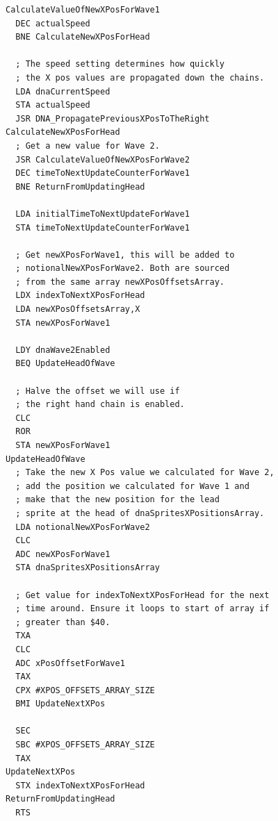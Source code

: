 \begin{minipage}[b]{0.55\linewidth}
\centering
  \begin{lstlisting}[basicstyle=\tiny, caption=Calculate the new X Pos value for the head sprites\, as well as propagate the
  values in \icode{dnaXPosDataHeadArray} to the right when required.]
CalculateValueOfNewXPosForWave1
  DEC actualSpeed
  BNE CalculateNewXPosForHead

  ; The speed setting determines how quickly 
  ; the X pos values are propagated down the chains.
  LDA dnaCurrentSpeed
  STA actualSpeed
  JSR DNA_PropagatePreviousXPosToTheRight
CalculateNewXPosForHead   
  ; Get a new value for Wave 2.
  JSR CalculateValueOfNewXPosForWave2
  DEC timeToNextUpdateCounterForWave1
  BNE ReturnFromUpdatingHead

  LDA initialTimeToNextUpdateForWave1
  STA timeToNextUpdateCounterForWave1

  ; Get newXPosForWave1, this will be added to
  ; notionalNewXPosForWave2. Both are sourced
  ; from the same array newXPosOffsetsArray.
  LDX indexToNextXPosForHead
  LDA newXPosOffsetsArray,X
  STA newXPosForWave1

  LDY dnaWave2Enabled
  BEQ UpdateHeadOfWave

  ; Halve the offset we will use if
  ; the right hand chain is enabled.
  CLC
  ROR 
  STA newXPosForWave1
UpdateHeadOfWave   
  ; Take the new X Pos value we calculated for Wave 2,
  ; add the position we calculated for Wave 1 and 
  ; make that the new position for the lead
  ; sprite at the head of dnaSpritesXPositionsArray.
  LDA notionalNewXPosForWave2
  CLC
  ADC newXPosForWave1
  STA dnaSpritesXPositionsArray

  ; Get value for indexToNextXPosForHead for the next
  ; time around. Ensure it loops to start of array if 
  ; greater than $40.
  TXA
  CLC
  ADC xPosOffsetForWave1
  TAX
  CPX #XPOS_OFFSETS_ARRAY_SIZE
  BMI UpdateNextXPos

  SEC
  SBC #XPOS_OFFSETS_ARRAY_SIZE
  TAX
UpdateNextXPos   
  STX indexToNextXPosForHead
ReturnFromUpdatingHead   
  RTS
\end{lstlisting}
\end{minipage}








